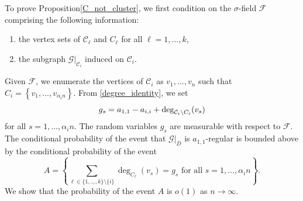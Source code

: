\documentclass[11pt,reqno]{amsart}
\renewcommand{\theenumi}{\roman{enumi}}
\theoremstyle{definition}
\theoremstyle{remark}
\theoremstyle{conjecture}
\begin{document}
To prove Proposition\ref{C_not_cluster}, we first condition on the $\sigma$-field $\mathcal{F}$ comprising the following information:
\renewcommand{\theenumi}{\roman{enumi}}
\begin{enumerate}
\item the vertex sets of $\mathcal{C}_{\ell}$ and $C_{\ell}$ for all $\ell = 1, \ldots, k$,
\item the subgraph $\mathcal{G}|_{\mathcal{C}_{i}}$ induced on $\mathcal{C}_{i}$.
\end{enumerate}
Given $\mathcal{F}$, we enumerate the vertices of $\mathcal{C}_{i}$ as $v_{1}, \ldots, v_{n}$ such that $C_{i} = \left\{v_{1}, \ldots, v_{\alpha_{i}n}\right\}$. From \eqref{degree_identity}, we set 
\begin{equation}\label{g_{s}_values}
g_{s} = a_{1,1} - a_{i,i} + \deg_{\mathcal{C}_{i} \setminus C_{i}}(v_{s})
\end{equation}
for all $s = 1, \ldots, \alpha_{i} n$. The random variables $g_{s}$ are measurable with respect to $\mathcal{F}$. The conditional probability of the event that $\mathcal{G}|_{D}$ is $a_{1,1}$-regular is bounded above by the conditional probability of the event 
\begin{equation}
A = \left\{\sum_{\ell \in \{1, \ldots, k\} \setminus \{i\}} \deg_{C_{\ell}}(v_{s}) = g_{s} \text{ for all } s = 1, \ldots, \alpha_{i} n\right\}. \nonumber
\end{equation}
We show that the probability of the event $A$ is $o(1)$ as $n \rightarrow \infty$. 
\end{document}
